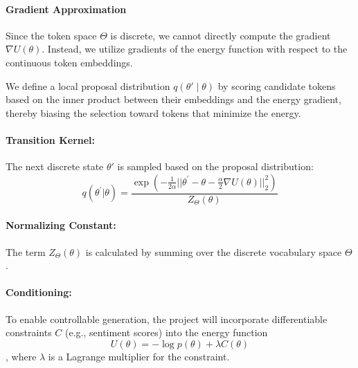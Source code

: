 \documentclass[11pt]{article}
\begin{document}

\paragraph{Gradient Approximation}
Since the token space $\Theta$ is discrete, we cannot directly compute the gradient $\nabla U(\theta)$. Instead, we utilize gradients of the energy function with respect to the continuous token embeddings. 

We define a local proposal distribution $q(\theta' \mid \theta)$ by scoring candidate tokens based on the inner product between their embeddings and the energy gradient, thereby biasing the selection toward tokens that minimize the energy.


\paragraph{Transition Kernel:} 
The next discrete state $\theta'$ is sampled based on the proposal distribution:
\[
q(\theta^{\prime}|\theta)=\frac{\exp(-\frac{1}{2\alpha}||\theta^{\prime}-\theta-\frac{\alpha}{2}\nabla U(\theta)||_{2}^{2})}{Z_{\Theta}(\theta)}
\]


\paragraph{Normalizing Constant:} 
The term $Z_{\Theta}(\theta)$ is calculated by summing over the discrete vocabulary space $\Theta$.

\paragraph{Conditioning:} To enable controllable generation,  the project will incorporate differentiable constraints $C$ (e.g., sentiment scores) into the energy function 
\[
U(\theta) = -\log p(\theta) + \lambda C(\theta)
\], where $\lambda$ is a Lagrange multiplier for the constraint.
\end{document}
